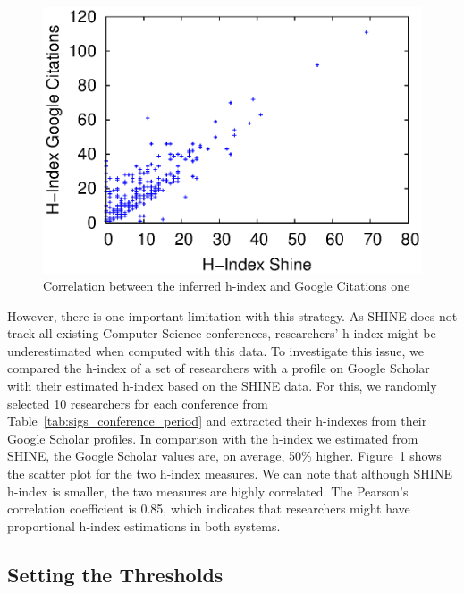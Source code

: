 \documentclass[letterpaper]{www13-companion-accepted}
\begin{document}
\begin{figure}[!htb]
\centering
\includegraphics[scale=.5]{graficos/hindex/hindex_scatter_plot.eps}
\caption{Correlation between the inferred h-index and Google Citations one}
\vspace{-0.2cm}
\label{fig:hindex_scatter_plot}
\vspace{-0.2cm}
\end{figure}

However, there is one important limitation with this strategy.  As SHINE does not track all existing Computer Science conferences, researchers' h-index might be underestimated when computed
with this data. To investigate this issue, we compared the h-index of a set of researchers with a profile on Google Scholar with their estimated h-index based on the SHINE data. For this, we
randomly selected 10 researchers for each conference from Table~\ref{tab:sigs_conference_period} and extracted their h-indexes from their Google Scholar profiles.  In comparison
with the h-index we estimated from SHINE, the Google Scholar values are, on average, 50\% higher. Figure~\ref{fig:hindex_scatter_plot} shows the scatter plot for the two h-index
measures. We can note that although SHINE h-index is smaller, the two measures are highly correlated. The Pearson's correlation coefficient is 0.85, which indicates that researchers
might have proportional h-index estimations in both systems. 

\subsection{Setting the Thresholds}
\label{sub:thresholds}
\end{document}
